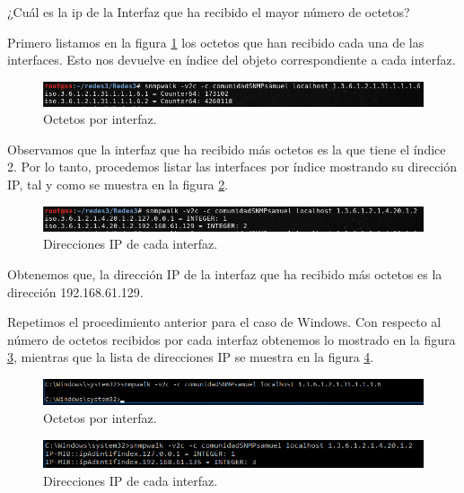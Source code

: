 \item ¿Cuál es la ip de la Interfaz que ha recibido el mayor número de octetos?

Primero listamos en la figura \ref{image:octetos} los octetos que han recibido cada una de las interfaces. Esto nos devuelve en índice del objeto correspondiente a cada interfaz.

\FloatBarrier
\begin{figure}[htbp!]
		\centering
			\includegraphics[width=.9 \textwidth]{images/7-linux-1}
		\caption{Octetos por interfaz.}
		\label{image:octetos}
\end{figure}
\FloatBarrier

Observamos que la interfaz que ha recibido más octetos es la que tiene el índice 2. Por lo tanto, procedemos listar las interfaces por índice mostrando su dirección IP, tal y como se muestra en la figura \ref{image:ips}.

\FloatBarrier
\begin{figure}[htbp!]
		\centering
			\includegraphics[width=.9 \textwidth]{images/7-linux-2}
		\caption{Direcciones IP de cada interfaz.}
		\label{image:ips}
\end{figure}
\FloatBarrier

Obtenemos que, la dirección IP de la interfaz que ha recibido más octetos es la dirección 192.168.61.129.

Repetimos el procedimiento anterior para el caso de Windows. Con respecto al número de octetos recibidos por cada interfaz obtenemos lo mostrado en la figura \ref{image:octetos-windows}, mientras que la lista de direcciones IP se muestra en la figura \ref{image:ips-windows}.

\FloatBarrier
\begin{figure}[htbp!]
		\centering
			\includegraphics[width=.9 \textwidth]{images/7-windows-1}
		\caption{Octetos por interfaz.}
		\label{image:octetos-windows}
\end{figure}
\FloatBarrier

\FloatBarrier
\begin{figure}[htbp!]
		\centering
			\includegraphics[width=.9 \textwidth]{images/7-windows-2}
		\caption{Direcciones IP de cada interfaz.}
		\label{image:ips-windows}
\end{figure}
\FloatBarrier

